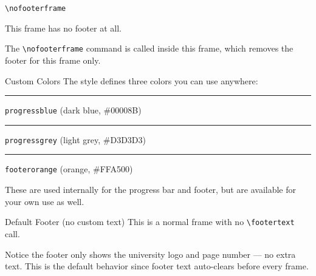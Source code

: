 \documentclass[notes, aspectratio=169]{beamer}       %
\begin{document}

    \begin{frame}{\texttt{\textbackslash nofooterframe}}
    \nofooterframe
        \begin{center}
            This frame has no footer at all.

            The \texttt{\textbackslash nofooterframe} command is called inside this frame, which removes the footer for this frame only.
        \end{center}
    \end{frame}


    \begin{frame}{Custom Colors}
        The style defines three colors you can use anywhere:

        \bigskip

        \textcolor{progressblue}{\rule{3cm}{0.5cm}} \texttt{progressblue} (dark blue, \#00008B)

        \bigskip

        \textcolor{progressgrey}{\rule{3cm}{0.5cm}} \texttt{progressgrey} (light grey, \#D3D3D3)

        \bigskip

        \textcolor{footerorange}{\rule{3cm}{0.5cm}} \texttt{footerorange} (orange, \#FFA500)

        \bigskip

        These are used internally for the progress bar and footer, but are available for your own use as well.
    \end{frame}

    \begin{frame}{Default Footer (no custom text)}
        This is a normal frame with no \texttt{\textbackslash footertext} call.

        Notice the footer only shows the university logo and page number --- no extra text. This is the default behavior since footer text auto-clears before every frame.
    \end{frame} 
\end{document}
